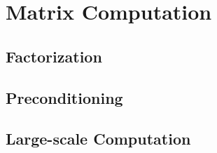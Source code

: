 \chapter{Matrix Computation}

\section{Factorization}

\section{Preconditioning}

\section{Large-scale Computation}